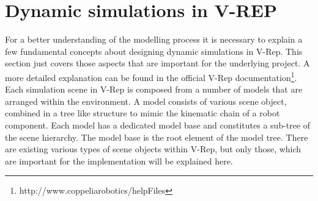 \section{Dynamic simulations in V-REP}
For a better understanding of the modelling process it is necessary to explain a few fundamental concepts about designing dynamic simulations in V-Rep. This section just covers those aspects that are important for the underlying project. A more detailed explanation can be found in the official V-Rep documentation\footnote{http://www.coppeliarobotics/helpFiles}. \\

Each simulation scene in V-Rep is composed from a number of models that are arranged within the environment. A model consists of various scene object, combined in a tree like structure to mimic the kinematic chain of a robot component. Each model has a dedicated model base and constitutes a sub-tree of the scene hierarchy. The model base is the root element of the model tree. There are existing various types of scene objects within V-Rep, but only those, which are important for the implementation will be explained here.

